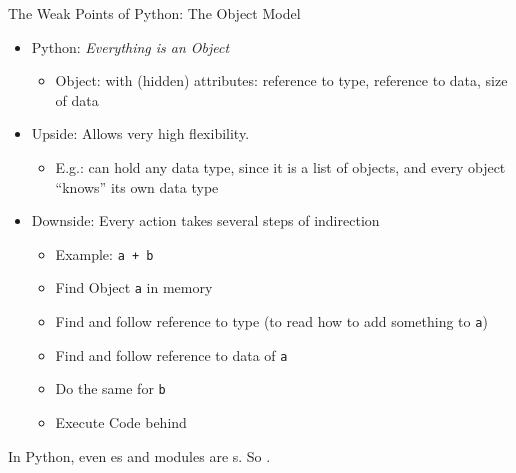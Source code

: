 
\begin{frame}[fragile]{The Weak Points of Python: The Object Model}
%
\begin{itemize}
\item Python: \emph{Everything is an Object}
	\begin{itemize}
	\item Object:  with (hidden) attributes: reference to type, reference to data, size of data
	\end{itemize}
\item Upside: Allows very high flexibility. 
	\begin{itemize}
	\item E.\;g.:  can hold any data type, since it is a list of objects, and every object \enquote{knows} its own data type
	\end{itemize}
\item Downside: Every action takes several steps of indirection
	\begin{itemize}
	\item Example: \texttt{a + b}
	\item Find Object \texttt{a} in memory
	\item Find and follow reference to type (to read how to add something to \texttt{a})
	\item Find and follow reference to data of \texttt{a}
	\item Do the same for \texttt{b}
	\item Execute Code behind 
	\end{itemize}
\end{itemize}
%
\begin{hintbox}
\scriptsize
In Python, even es and modules are s. So .
\end{hintbox}
%
\end{frame}


